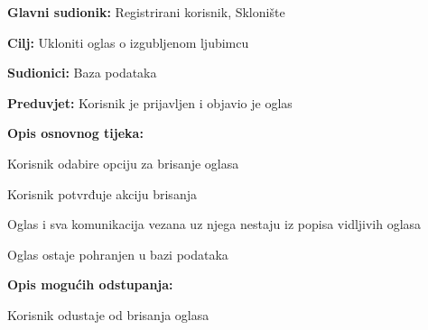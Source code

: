 					\pagebreak
					\noindent {}
					\begin{packed_item}
						
						\item \textbf{Glavni sudionik: }Registrirani korisnik, Sklonište
						\item  \textbf{Cilj:} Ukloniti oglas o izgubljenom ljubimcu
						\item  \textbf{Sudionici:} Baza podataka
						\item  \textbf{Preduvjet:} Korisnik je prijavljen i objavio je oglas
						\item  \textbf{Opis osnovnog tijeka:}
						
						\item[] \begin{packed_enum}
							
							\item Korisnik odabire opciju za brisanje oglasa
							\item Korisnik potvrđuje akciju brisanja
							\item Oglas i sva komunikacija vezana uz njega nestaju iz popisa vidljivih oglasa
							\item Oglas ostaje pohranjen u bazi podataka
						\end{packed_enum}
						
						\item  \textbf{Opis mogućih odstupanja:}
						
						\item[] \begin{packed_item}
							
							\item[2.a] Korisnik odustaje od brisanja oglasa
						\end{packed_item}
					\end{packed_item}
					
